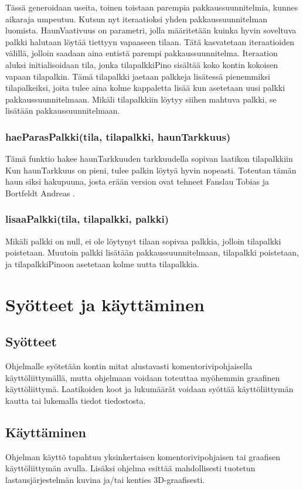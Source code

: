\documentclass[a4paper,12pt, titlepage]{article}
\begin{document}
\noindent
Tässä generoidaan useita, toinen toistaan parempia pakkaussuunnitelmia, kunnes aikaraja umpeutuu. Kutsun nyt iteraatioksi yhden pakkaussuunnitelman luomista. HaunVaativuus on parametri, jolla määritetään kuinka hyvin soveltuva palkki halutaan löytää tiettyyn vapaaseen tilaan. Tätä kasvatetaan iteraatioiden välillä, jolloin saadaan aina entistä parempi pakkaussuunnitelma. Iteraation aluksi initialisoidaan tila, jonka tilapalkkiPino sisältää koko kontin kokoisen vapaan tilapalkin. Tämä tilapalkki jaetaan palkkeja lisätessä pienemmiksi tilapalkeiksi, joita tulee aina kolme kappaletta lisää kun asetetaan uusi palkki pakkaussuunnitelmaan. Mikäli tilapalkkiin löytyy siihen mahtuva palkki, se lisätään pakkaussuunnitelmaan.

\subsubsection*{haeParasPalkki(tila, tilapalkki, haunTarkkuus)}
Tämä funktio hakee haunTarkkuuden tarkkuudella sopivan laatikon tilapalkkiin Kun haunTarkkuus on pieni, tulee palkin löytyä hyvin nopeasti. Toteutan tämän haun siksi hakupuuna, josta erään version ovat tehneet Fanslau Tobias ja Bortfeldt Andreas \cite{fanslau-bortfeldt}.

\subsubsection*{lisaaPalkki(tila, tilapalkki, palkki)}
Mikäli palkki on null, ei ole löytynyt tilaan sopivaa palkkia, jolloin tilapalkki poistetaan. Muutoin palkki lisätään pakkaussuunnitelmaan, tilapalkki poistetaan, ja tilapalkkiPinoon asetetaan kolme uutta tilapalkkia.

\section*{Syötteet ja käyttäminen}
\subsection*{Syötteet}
Ohjelmalle syötetään kontin mitat alustavasti komentorivipohjaisella käyttöliittymällä, mutta ohjelmaan voidaan toteuttaa myöhemmin graafinen käyttöliittymä. Laatikoiden koot ja lukumäärät voidaan syöttää käyttöliittymän kautta tai lukemalla tiedot tiedostosta.

\subsection*{Käyttäminen}
Ohjelman käyttö tapahtuu yksinkertaisen komentorivipohjaisen tai graafisen käyttöliittymän avulla. Lisäksi ohjelma esittää mahdollisesti tuotetun lastausjärjestelmän kuvina ja/tai kenties 3D-graafisesti.
\end{document}
